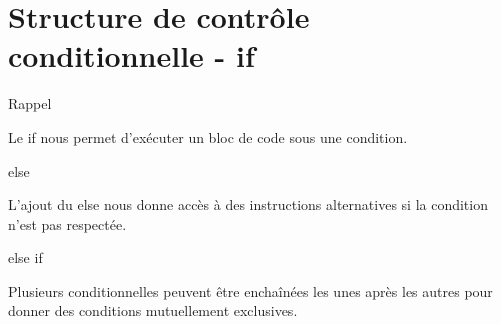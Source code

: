 \hypertarget{structure-de-contruxf4le-conditionnelle---if}{%
\section{Structure de contrôle conditionnelle -
if}\label{structure-de-contruxf4le-conditionnelle---if}}

\begin{frame}[fragile]{Rappel}
\protect\hypertarget{rappel}{}

Le if nous permet d'exécuter un bloc de code sous une condition.

\begin{Shaded}
\begin{Highlighting}[]
\NormalTok{\}}
\NormalTok{) \{}
\NormalTok{);}
\NormalTok{\}}
\end{Highlighting}
\end{Shaded}

\end{frame}

\begin{frame}[fragile]{else}
\protect\hypertarget{else}{}

L'ajout du else nous donne accès à des instructions alternatives si la
condition n'est pas respectée.

\begin{Shaded}
\begin{Highlighting}[]
\NormalTok{) \{}
\NormalTok{);}
\NormalTok{\} }\NormalTok{ \{}
\NormalTok{);}
\NormalTok{\}}
\end{Highlighting}
\end{Shaded}

\end{frame}

\begin{frame}[fragile]{else if}
\protect\hypertarget{else-if}{}

Plusieurs conditionnelles peuvent être enchaînées les unes après les
autres pour donner des conditions mutuellement exclusives.

\begin{Shaded}
\begin{Highlighting}[]
\NormalTok{) \{}
\NormalTok{);}
\NormalTok{\} } \NormalTok{) \{}
\NormalTok{);}
\NormalTok{\} } \NormalTok{) \{}
\NormalTok{\}}
\end{Highlighting}
\end{Shaded}

\end{frame}

